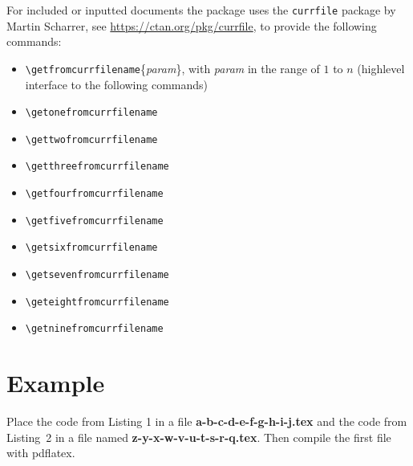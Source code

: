 \documentclass[12pt]{scrartcl}
\begin{document}
For included or inputted documents the package uses the \texttt{currfile} package  by Martin Scharrer, see \url{https://ctan.org/pkg/currfile}, to provide the following commands: 

\begin{itemize}
	\item \verb|\getfromcurrfilename|\{\textit{param}\}, with \textit{param} in the
	 range of $1$ to $n$ (highlevel interface to the following commands)
	\item \verb|\getonefromcurrfilename|
	\item \verb|\gettwofromcurrfilename|
	\item \verb|\getthreefromcurrfilename|
	\item \verb|\getfourfromcurrfilename|
	\item \verb|\getfivefromcurrfilename|
	\item \verb|\getsixfromcurrfilename|
	\item \verb|\getsevenfromcurrfilename|
	\item \verb|\geteightfromcurrfilename|
	\item \verb|\getninefromcurrfilename|	
\end{itemize}

\section*{Example}

Place the code from Listing 1 in a file \textbf{a-b-c-d-e-f-g-h-i-j.tex} and the code from
 Listing~2 in a file named \textbf{z-y-x-w-v-u-t-s-r-q.tex}. Then compile the first file with pdflatex.
\end{document}
